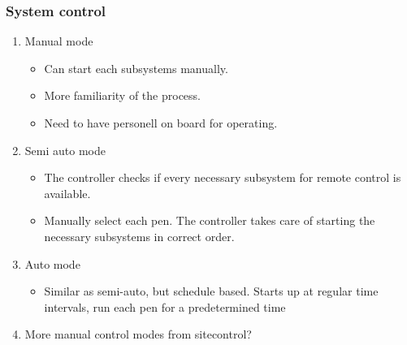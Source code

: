 \documentclass{beamer}
\begin{document}
\begin{frame}
  \frametitle{System control}
    \begin{enumerate}
    \vspace{0pt} %
    \item<1-> Manual mode
    \begin{itemize}
    \item<2-> Can start each subsystems manually. 
    \item<3-> More familiarity of the process.
    \item<4-> Need to have personell on board for operating.
    \end{itemize}
    \item<5-> Semi auto mode
    \begin{itemize}
      \item<6-> The controller checks if every necessary subsystem for remote control is available.
      \item<7-> Manually select each pen. The controller takes care of starting the necessary subsystems in correct order.
    \end{itemize}
    \item<8-> Auto mode
    \begin{itemize}
      \item<9-> Similar as semi-auto, but schedule based. Starts up at regular time intervals, run each pen for a predetermined time
    \end{itemize}
    \item<10-> More manual control modes from sitecontrol?
    \end{enumerate}
\end{frame}
\end{document}
